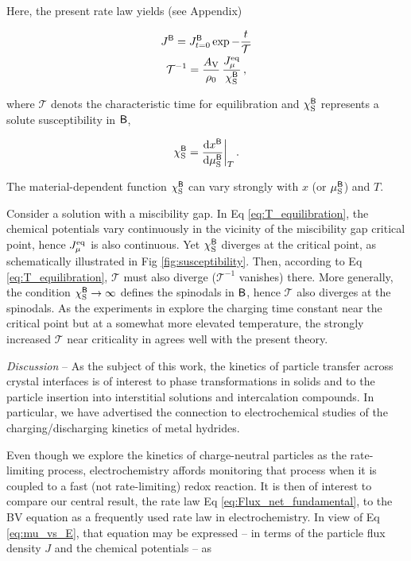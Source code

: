 \documentclass[english,aps,prb,showkeys,reprint]{revtex4-2}
\newcommand{\dd}{ \mathrm{d} }
\newcommand{\be}{\begin{equation}}
\newcommand{\ee}{\end{equation}}
\begin{document}
Here, the present rate law yields (see Appendix)

\begin{gather}
\label{eq:J_equilibration}
J^{\sf B}
=
J^{\sf B}_{t = 0} \exp - \frac{t}{\mathcal T}
\\
\label{eq:T_equilibration}
{\mathcal T}^{-1}
=
\frac{A_{\rm V}}{\rho_0} \, \frac{J^{\rm eq}_{\mu}}{\chi^{\sf B}_{\rm S}} \,,
\end{gather}

where ${\mathcal T}$ denots the characteristic time for equilibration and $\chi^{\sf B}_{\rm S}$ represents a solute susceptibility \cite{LarcheCahnLinear1973} in $\sf B$,

\be
\label{eq:chi_definition}
\chi^{\sf B}_{\rm S}
=
\frac{\dd x^{\sf B}}{\dd \mu^{\sf B}_{\rm S}} \bigg \rvert_{T} \,.
\ee

The material-dependent function $\chi^{\sf B}_{\rm S}$ can vary strongly with $x$ (or $\mu^{\sf B}_{\rm S}$) and $T$.

Consider a solution with a miscibility gap. In Eq \ref{eq:T_equilibration}, the chemical potentials vary continuously in the vicinity of the miscibility gap critical point, hence $J^{\rm eq}_{\mu}$ is also continuous. Yet $\chi_{\rm S}^{\sf B}$ diverges at the critical point, as schematically illustrated in Fig \ref{fig:susceptibility}. Then, according to Eq \ref{eq:T_equilibration}, ${\mathcal T}$ must also diverge (${\mathcal T}^{-1}$ vanishes) there. More generally, the condition $\chi_{\rm S}^{\sf B} \rightarrow \infty$ defines the spinodals in $\sf B$, hence ${\mathcal T}$ also diverges at the spinodals. As the experiments in \cite{BapariWeissmüller2025} explore the charging time constant near the critical point but at a somewhat more elevated temperature, the strongly increased ${\mathcal T}$ near criticality in \cite{BapariWeissmüller2025} agrees well with the present theory.

\textit{Discussion}
--
As the subject of this work, the kinetics of particle transfer across crystal interfaces is of interest to phase transformations in solids and to the particle insertion into interstitial solutions and intercalation compounds. In particular, we have advertised the connection to electrochemical studies of the charging/discharging kinetics of metal hydrides.

Even though we explore the kinetics of charge-neutral particles as the rate-limiting process, electrochemistry affords monitoring that process when it is coupled to a fast (not rate-limiting) redox reaction. It is then of interest to compare our central result, the rate law Eq \ref{eq:Flux_net_fundamental}, to the BV equation \cite{Dickinson2020,Fletcher2023} as a frequently used rate law in electrochemistry. In view of Eq \ref{eq:mu_vs_E}, that equation may be expressed -- in terms of the particle flux density $J$ and the chemical potentials -- as
\end{document}
